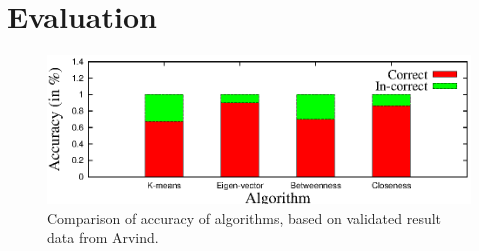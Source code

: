 \section{Evaluation}
\label{eval}

%
%
%
%
%
%
%
%
%
%
%
%
%
%
%
%
%
%
%

\begin{figure}[ht]
    \centering
    \includegraphics[width=1\textwidth]{figures/social-result_arvind.eps}
    \caption{Comparison of accuracy of algorithms, based on validated result data from Arvind.}
    \label{fig:social-result-arvind}
\end{figure}


